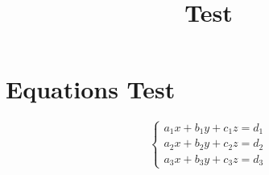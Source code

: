 \documentclass[a4paper,12pt]{article}
\begin{document}
\title{Test}\date{}\maketitle
\section{Equations Test}
\[
\left\{
\begin{array}{c}
a_1x+b_1y+c_1z=d_1 \\
a_2x+b_2y+c_2z=d_2 \\
a_3x+b_3y+c_3z=d_3
\end{array}
\right.
\]
\end{document}
